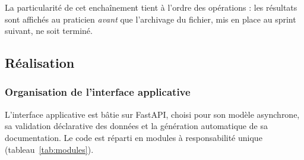 La particularité de cet enchaînement tient à l'ordre des opérations : les résultats sont
affichés au praticien \emph{avant} que l'archivage du fichier, mis en place au sprint
suivant, ne soit terminé.

\subsection{Réalisation}

\subsubsection{Organisation de l'interface applicative}

L'interface applicative est bâtie sur FastAPI, choisi pour son modèle asynchrone, sa
validation déclarative des données et la génération automatique de sa documentation. Le
code est réparti en modules à responsabilité unique (tableau~\ref{tab:modules}).

